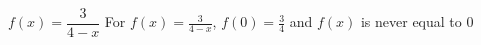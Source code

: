 {$f(x) = \dfrac{3}{4-x}$}
{For $f(x) =   \frac{3}{4-x}$, $f(0) = \frac{3}{4}$ and $f(x)$ is never equal to $0$}